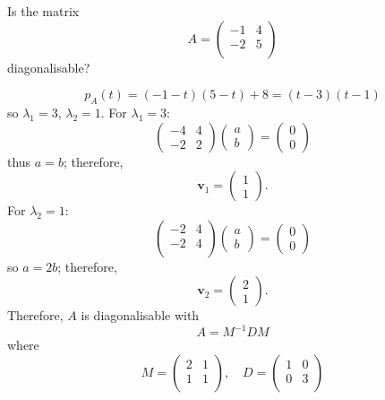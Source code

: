 \begin{example}
    Is the matrix
    \[
        A =
        \begin{pmatrix}
            -1 & 4 \\
            -2 & 5 \\
        \end{pmatrix}
    \]
    diagonalisable?
    
    \[ p_A(t) = (-1 - t) (5 - t) + 8 = (t - 3) (t - 1) \] so $\lambda_1 = 3$, $\lambda_2 = 1$. For $\lambda_1 = 3$:
    \[
        \begin{pmatrix}
            -4 & 4 \\
            -2 & 2 
        \end{pmatrix}
        \begin{pmatrix}
            a \\ b
        \end{pmatrix}
        =
        \begin{pmatrix}
            0 \\ 0
        \end{pmatrix}
    \]
    thus $a = b$; therefore,
    \[ 
        \bm{v}_1 =
        \begin{pmatrix}
            1 \\ 1
        \end{pmatrix}
        .
    \]
    For $\lambda_2 = 1$:
    \[
        \begin{pmatrix}
            -2 & 4 \\
            -2 & 4 \\
        \end{pmatrix}
        \begin{pmatrix}
            a \\ b
        \end{pmatrix}
        =
        \begin{pmatrix}
            0 \\ 0
        \end{pmatrix}
    \]
    so $a = 2b$; therefore,
    \[
        \bm{v}_2 =
        \begin{pmatrix}
            2 \\ 1
        \end{pmatrix}
        .
    \]
    Therefore, $A$ is diagonalisable with \[ A = M^{-1} D M \] where
    \[
        M =
        \begin{pmatrix}
           2 & 1 \\
           1 & 1 \\
        \end{pmatrix}
        , \quad D =
        \begin{pmatrix}
            1 & 0 \\
            0 & 3 \\
        \end{pmatrix}
    \]
\end{example}


